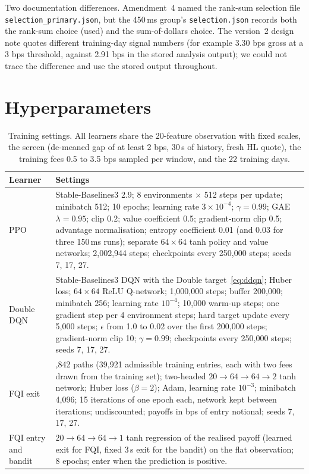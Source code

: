 \documentclass[12pt,a4paper]{article}
\DeclareRobustCommand{\bps}{\ifmmode\,\text{bps}\else\,bps\fi}
\begin{document}
Two documentation differences. Amendment~4 named the rank-sum selection file
\nolinkurl{selection_primary.json}, but the 450\,ms group's \texttt{selection.json} records both
the rank-sum choice (used) and the sum-of-dollars choice. The version~2 design note quotes
different training-day signal numbers (for example 3.30\bps{} gross at a 3\bps{} threshold,
against 2.91\bps{} in the stored analysis output); we could not trace the difference and use the
stored output throughout.

\section{Hyperparameters}\label{app:hyper}
\begin{table}[H]
\centering
\caption{Training settings. All learners share the 20-feature observation with fixed scales,
the screen (de-meaned gap of at least 2\bps, 30\,s of history, fresh HL quote), the training
fees 0.5 to 3.5\bps{} sampled per window, and the 22 training days.}
\label{tab:hyper}
\small
\begin{tabularx}{\textwidth}{@{}l>{\raggedright\arraybackslash}X@{}}
\toprule
Learner & Settings \\
\midrule
PPO & Stable-Baselines3 2.9; 8 environments $\times$ 512 steps per update; minibatch 512;
10 epochs; learning rate $3\times10^{-4}$; $\gamma=0.99$; GAE $\lambda=0.95$; clip 0.2; value
coefficient 0.5; gradient-norm clip 0.5; advantage normalisation; entropy coefficient 0.01 (and
0.03 for three 150\,ms runs); separate $64\times64$ tanh policy and value networks; 2,002,944
steps; checkpoints every 250,000 steps; seeds 7, 17, 27. \\
Double DQN & Stable-Baselines3 DQN with the Double target~\eqref{eq:ddqn}; Huber loss;
$64\times64$ ReLU Q-network; 1,000,000 steps; buffer 200,000; minibatch 256; learning rate
$10^{-4}$; 10,000 warm-up steps; one gradient step per 4 environment steps; hard target update
every 5,000 steps; $\epsilon$ from 1.0 to 0.02 over the first 200,000 steps; gradient-norm clip
10; $\gamma=0.99$; checkpoints every 250,000 steps; seeds 7, 17, 27. \\
FQI exit & 79,842 paths (39,921 admissible training entries, each with two fees drawn from the
training set); two-headed $20\to64\to64\to2$ tanh network; Huber loss ($\beta=2$); Adam,
learning rate $10^{-3}$; minibatch 4,096; 15 iterations of one epoch each, network kept between
iterations; undiscounted; payoffs in bps of entry notional; seeds 7, 17, 27. \\
FQI entry and bandit & $20\to64\to64\to1$ tanh regression of the realised payoff (learned exit
for FQI, fixed 3\,s exit for the bandit) on the flat observation; 8 epochs; enter when the
prediction is positive. \\
\bottomrule
\end{tabularx}
\end{table}
\end{document}
